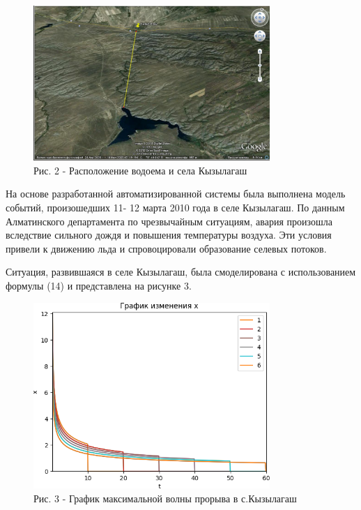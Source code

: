 \begin{figure}[H]
	\centering
	\includegraphics[width=0.8\textwidth]{media/ict/image3}
	\caption*{Рис. 2 - Расположение водоема и села Кызылагаш}
\end{figure}

\begin{multicols}{2}
На основе разработанной автоматизированной системы была выполнена модель
событий, произошедших 11- 12 марта 2010 года в селе Кызылагаш. По данным
Алматинского департамента по чрезвычайным ситуациям, авария произошла
вследствие сильного дождя и повышения температуры воздуха. Эти условия
привели к движению льда и спровоцировали образование селевых потоков.

Ситуация, развившаяся в селе Кызылагаш, была смоделирована с
использованием формулы (14) и представлена на рисунке 3.
\end{multicols}

\begin{figure}[H]
	\centering
	\includegraphics[width=0.8\textwidth]{media/ict/image4}
	\caption*{Рис. 3 - График максимальной волны прорыва в с.Кызылагаш}
\end{figure}

